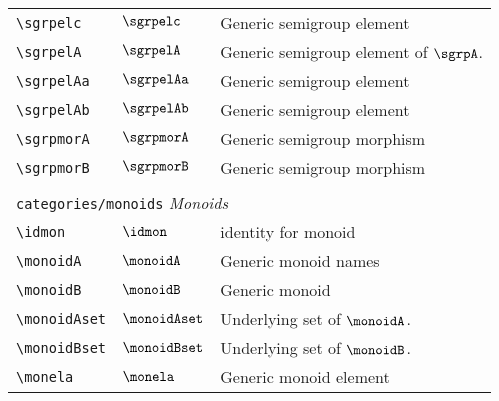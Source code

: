 \begin{longtable}{lll}
  {\color[rgb]{0.5,0.5,0.5}\texttt{\textbackslash sgrpelc}}                                                 & $\sgrpelc$                 & Generic semigroup element\\
  {\color[rgb]{0.5,0.5,0.5}\texttt{\textbackslash sgrpelA}}                                                 & $\sgrpelA$                 & Generic semigroup element of $\sgrpA$.\\
  {\color[rgb]{0.5,0.5,0.5}\texttt{\textbackslash sgrpelAa}}                                                & $\sgrpelAa$                & Generic semigroup element\\
  {\color[rgb]{0.5,0.5,0.5}\texttt{\textbackslash sgrpelAb}}                                                & $\sgrpelAb$                & Generic semigroup element\\
  {\color[rgb]{0.5,0.5,0.5}\texttt{\textbackslash sgrpmorA}}                                                & $\sgrpmorA$                & Generic semigroup morphism\\
  {\color[rgb]{0.5,0.5,0.5}\texttt{\textbackslash sgrpmorB}}                                                & $\sgrpmorB$                & Generic semigroup morphism                              \\
  &                            &                                                         \\
  \multicolumn{3}{l}{{\color[rgb]{0.5,0.5,0.5}\texttt{categories/monoids}} \emph{Monoids}}
  \\
  \hline
  {\color[rgb]{0.5,0.5,0.5}\texttt{\textbackslash idmon}}                                                   & $\idmon$                   & identity for monoid\\
  {\color[rgb]{0.5,0.5,0.5}\texttt{\textbackslash monoidA}}                                                 & $\monoidA$                 & Generic monoid names\\
  {\color[rgb]{0.5,0.5,0.5}\texttt{\textbackslash monoidB}}                                                 & $\monoidB$                 & Generic monoid\\
  {\color[rgb]{0.5,0.5,0.5}\texttt{\textbackslash monoidAset}}                                              & $\monoidAset$              & Underlying set of $\monoidA$.\\
  {\color[rgb]{0.5,0.5,0.5}\texttt{\textbackslash monoidBset}}                                              & $\monoidBset$              & Underlying set of $\monoidB$.\\
  {\color[rgb]{0.5,0.5,0.5}\texttt{\textbackslash monela}}                                                  & $\monela$                  & Generic monoid element\\

\end{longtable}

